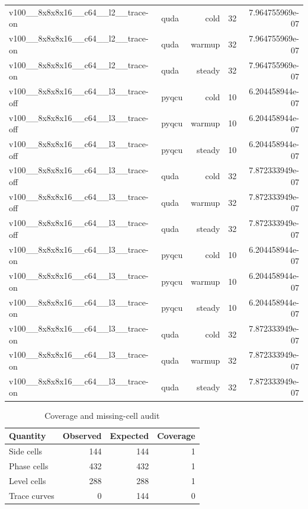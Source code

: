 \begin{table}[htbp]
\begin{tabular}{@{}llrrr@{}}
v100\_\_8x8x8x16\_\_c64\_\_l2\_\_trace-on & quda & cold & 32 & 7.964755969e-07 \\
v100\_\_8x8x8x16\_\_c64\_\_l2\_\_trace-on & quda & warmup & 32 & 7.964755969e-07 \\
v100\_\_8x8x8x16\_\_c64\_\_l2\_\_trace-on & quda & steady & 32 & 7.964755969e-07 \\
v100\_\_8x8x8x16\_\_c64\_\_l3\_\_trace-off & pyqcu & cold & 10 & 6.204458944e-07 \\
v100\_\_8x8x8x16\_\_c64\_\_l3\_\_trace-off & pyqcu & warmup & 10 & 6.204458944e-07 \\
v100\_\_8x8x8x16\_\_c64\_\_l3\_\_trace-off & pyqcu & steady & 10 & 6.204458944e-07 \\
v100\_\_8x8x8x16\_\_c64\_\_l3\_\_trace-off & quda & cold & 32 & 7.872333949e-07 \\
v100\_\_8x8x8x16\_\_c64\_\_l3\_\_trace-off & quda & warmup & 32 & 7.872333949e-07 \\
v100\_\_8x8x8x16\_\_c64\_\_l3\_\_trace-off & quda & steady & 32 & 7.872333949e-07 \\
v100\_\_8x8x8x16\_\_c64\_\_l3\_\_trace-on & pyqcu & cold & 10 & 6.204458944e-07 \\
v100\_\_8x8x8x16\_\_c64\_\_l3\_\_trace-on & pyqcu & warmup & 10 & 6.204458944e-07 \\
v100\_\_8x8x8x16\_\_c64\_\_l3\_\_trace-on & pyqcu & steady & 10 & 6.204458944e-07 \\
v100\_\_8x8x8x16\_\_c64\_\_l3\_\_trace-on & quda & cold & 32 & 7.872333949e-07 \\
v100\_\_8x8x8x16\_\_c64\_\_l3\_\_trace-on & quda & warmup & 32 & 7.872333949e-07 \\
v100\_\_8x8x8x16\_\_c64\_\_l3\_\_trace-on & quda & steady & 32 & 7.872333949e-07 \\
\bottomrule
\end{tabular}
\end{table}

\begin{table}[htbp]
\centering
\caption{Coverage and missing-cell audit}
\small
\begin{tabular}{@{}lrrr@{}}
\toprule
Quantity & Observed & Expected & Coverage \\
\midrule
Side cells & 144 & 144 & 1 \\
Phase cells & 432 & 432 & 1 \\
Level cells & 288 & 288 & 1 \\
Trace curves & 0 & 144 & 0 \\
\bottomrule
\end{tabular}
\end{table}
